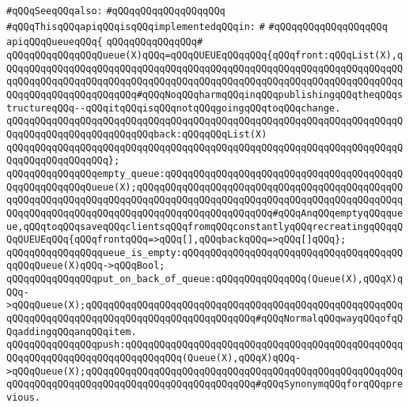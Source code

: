 \newline
\newline
\verb|#qQQqSeeqQQqalso:|\newline
\verb|#qQQqqQQqqQQqqQQqqQQq|\newline
\newline
\verb|#qQQqThisqQQqapiqQQqisqQQqimplementedqQQqin:|\newline
\verb|#|\newline
\verb|#qQQqqQQqqQQqqQQqqQQq|\newline
\newline
\verb|apiqQQqQueueqQQq{|\newline
\verb|qQQqqQQqqQQqqQQq#|\newline
\verb|qQQqqQQqqQQqqQQqQueue(X)qQQq=qQQqQUEUEqQQqqQQq{qQQqfront:qQQqList(X),qQQqqQQqqQQqqQQqqQQqqQQqqQQqqQQqqQQqqQQqqQQqqQQqqQQqqQQqqQQqqQQqqQQqqQQqqQQqqQQqqQQqqQQqqQQqqQQqqQQqqQQqqQQqqQQqqQQqqQQqqQQqqQQqqQQqqQQqqQQqqQQqqQQqqQQqqQQqqQQqqQQq#qQQqNoqQQqharmqQQqinqQQqpublishingqQQqtheqQQqstructureqQQq--qQQqitqQQqisqQQqnotqQQqgoingqQQqtoqQQqchange.|\newline
\verb|qQQqqQQqqQQqqQQqqQQqqQQqqQQqqQQqqQQqqQQqqQQqqQQqqQQqqQQqqQQqqQQqqQQqqQQqqQQqqQQqqQQqqQQqqQQqqQQqback:qQQqqQQqList(X)|\newline
\verb|qQQqqQQqqQQqqQQqqQQqqQQqqQQqqQQqqQQqqQQqqQQqqQQqqQQqqQQqqQQqqQQqqQQqqQQqqQQqqQQqqQQqqQQq};|\newline
\newline
\verb|qQQqqQQqqQQqqQQqempty_queue:qQQqqQQqqQQqqQQqqQQqqQQqqQQqqQQqqQQqqQQqqQQqqQQqqQQqqQQqQueue(X);qQQqqQQqqQQqqQQqqQQqqQQqqQQqqQQqqQQqqQQqqQQqqQQqqQQqqQQqqQQqqQQqqQQqqQQqqQQqqQQqqQQqqQQqqQQqqQQqqQQqqQQqqQQqqQQqqQQqqQQqqQQqqQQqqQQqqQQqqQQqqQQqqQQqqQQqqQQqqQQqqQQq#qQQqAnqQQqemptyqQQqqueue,qQQqtoqQQqsaveqQQqclientsqQQqfromqQQqconstantlyqQQqrecreatingqQQqqQQqQUEUEqQQq{qQQqfrontqQQq=>qQQq[],qQQqbackqQQq=>qQQq[]qQQq};|\newline
\verb|qQQqqQQqqQQqqQQqqueue_is_empty:qQQqqQQqqQQqqQQqqQQqqQQqqQQqqQQqqQQqqQQqqQQqQueue(X)qQQq->qQQqBool;|\newline
\newline
\verb|qQQqqQQqqQQqqQQqput_on_back_of_queue:qQQqqQQqqQQqqQQq(Queue(X),qQQqX)qQQq->qQQqQueue(X);qQQqqQQqqQQqqQQqqQQqqQQqqQQqqQQqqQQqqQQqqQQqqQQqqQQqqQQqqQQqqQQqqQQqqQQqqQQqqQQqqQQqqQQqqQQqqQQqqQQq#qQQqNormalqQQqwayqQQqofqQQqaddingqQQqanqQQqitem.|\newline
\verb|qQQqqQQqqQQqqQQqpush:qQQqqQQqqQQqqQQqqQQqqQQqqQQqqQQqqQQqqQQqqQQqqQQqqQQqqQQqqQQqqQQqqQQqqQQqqQQqqQQq(Queue(X),qQQqX)qQQq->qQQqQueue(X);qQQqqQQqqQQqqQQqqQQqqQQqqQQqqQQqqQQqqQQqqQQqqQQqqQQqqQQqqQQqqQQqqQQqqQQqqQQqqQQqqQQqqQQqqQQqqQQqqQQq#qQQqSynonymqQQqforqQQqprevious.|\newline
